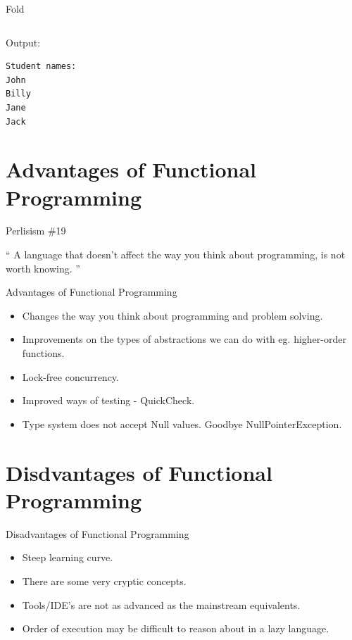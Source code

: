 \documentclass{beamer}
\begin{document}
\begin{frame}[fragile]{Fold}

  \inputminted[firstline=10,lastline=13]{haskell}{code/studentfold.hs}

  \vskip5mm

Output:
  \begin{verbatim}
Student names:
John
Billy
Jane
Jack
  \end{verbatim}

\end{frame}

\section{Advantages of Functional Programming}

\begin{frame}{Perlisism \#19}

\begin{exampleblock}{}
  {\Large ``
    A language that doesn't affect the way you think about programming, is not worth knowing.
  ''}
  \vskip5mm
  \hspace*{}
\end{exampleblock}

\end{frame}

\begin{frame}{Advantages of Functional Programming}

  \begin{itemize}[<+->]
  \item Changes the way you think about programming and problem solving.
  \item Improvements on the types of abstractions we can do with eg.
    higher-order functions.
  \item Lock-free concurrency.
  \item Improved ways of testing - QuickCheck.
  \item Type system does not accept Null values. Goodbye NullPointerException.
  \end{itemize}

\end{frame}

\section{Disdvantages of Functional Programming}

\begin{frame}{Disadvantages of Functional Programming}

  \begin{itemize}[<+->]
  \item Steep learning curve.
  \item There are some very cryptic concepts.
  \item Tools/IDE's are not as advanced as the mainstream equivalents.
  \item Order of execution may be difficult to reason about in a lazy language.
  \end{itemize}

\end{frame}
\end{document}
